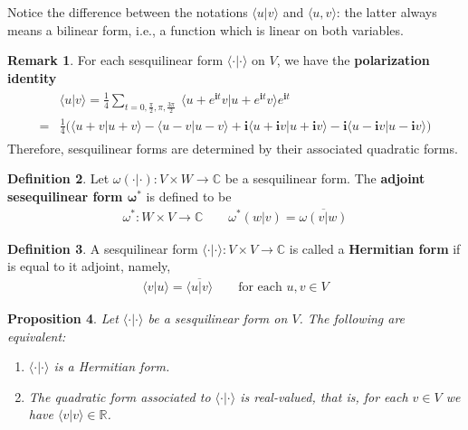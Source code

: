 \documentclass[12pt,b5paper,notitlepage]{article}
\theoremstyle{definition}
\newtheorem{df}{Definition}[subsection]
\newtheorem{rem}[df]{Remark}
\theoremstyle{plain}
\newtheorem{pp}[df]{Proposition}
\newcommand{\ovl}{\overline}
\newcommand{\bk}[1]{\langle {#1}\rangle}
\newcommand{\im}{\mathbf{i}}
\newcommand{\Cbb}{\mathbb C}
\newcommand{\Rbb}{\mathbb R}
\numberwithin{equation}{section}
\begin{document}
Notice the difference between the notations $\bk{u|v}$ and $\bk{u,v}$: the latter always means a bilinear form, i.e., a function which is linear on both variables.


\begin{rem}\label{lb237}
For each sesquilinear form $\bk{\cdot|\cdot}$ on $V$, we have the \textbf{polarization identity} 
\begin{align}\label{eq134}
\begin{aligned}
&\bk{u|v}=\frac 14\sum_{t=0,\frac \pi 2,\pi,\frac{3\pi}2}~ \bk{u+e^{\im t}v|u+e^{\im t}v}e^{\im t}\\
=&\frac 14\Big(\bk{u+v|u+v}-\bk{u-v|u-v}+\im\bk{u+\im v|u+\im v}-\im\bk{u-\im v|u-\im v}\Big)
\end{aligned}
\end{align}
Therefore, sesquilinear forms are determined by their associated quadratic forms.
\end{rem}



\begin{df}
Let $\omega(\cdot|\cdot):V\times W\rightarrow\Cbb$ be a sesquilinear form. The \textbf{adjoint sesequilinear form $\pmb{\omega^*}$}   is defined to be
\begin{align*}
\omega^*:W\times V\rightarrow\Cbb\qquad \omega^*(w|v)=\ovl{\omega(v|w)}
\end{align*}
\end{df}


\begin{df}
A sesquilinear form $\bk{\cdot|\cdot}:V\times V\rightarrow\Cbb$ is called a \textbf{Hermitian form}  if is equal to it adjoint, namely, 
\begin{align*}
\bk{v|u}=\ovl{\bk{u|v}}\qquad\text{for each }u,v\in V
\end{align*}
\end{df}



\begin{pp}\label{lb113}
Let $\bk{\cdot|\cdot}$ be a sesquilinear form on $V$. The following are equivalent:
\begin{enumerate}[label=(\arabic*)]
\item $\bk{\cdot|\cdot}$ is a Hermitian form.
\item The quadratic form associated to $\bk{\cdot|\cdot}$ is real-valued, that is, for each $v\in V$ we have $\bk{v|v}\in\Rbb$.
\end{enumerate}
\end{pp}
\end{document}
